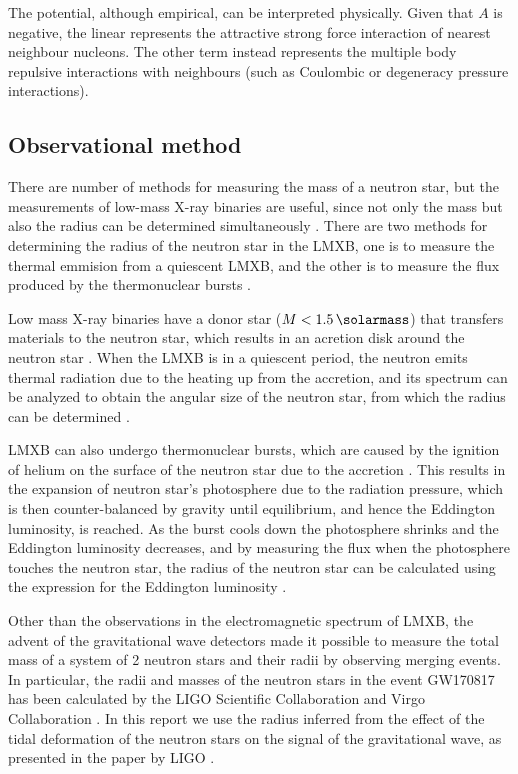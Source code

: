 \documentclass[draft,11pt]{article}
\theoremstyle{definition}
\theoremstyle{remark}
\begin{document}
                The potential, although empirical, can be interpreted physically. Given that $A$ is negative, the linear represents the attractive strong force interaction of nearest neighbour nucleons. The other term instead represents the multiple body repulsive interactions with neighbours \parencite{bludman.dover.1980/extrapolation.skyrme.eos} (such as Coulombic or degeneracy pressure interactions).
            
        \subsection{Observational method}
            There are number of methods for measuring the mass of a neutron star, but the measurements of low-mass X-ray binaries are useful, since not only the mass but also the radius can be determined simultaneously \parencite{ozel.paulo.2016/masses.radii.eos}. There are two methods for determining the radius of the neutron star in the LMXB, one is to measure the thermal emmision from a quiescent LMXB, and the other is to measure the flux produced by the thermonuclear bursts \parencite{ozel.paulo.2016/masses.radii.eos}.
            
            Low mass X-ray binaries have a donor star ($M<\SI{1.5}{\solarmass}$) that transfers materials to the neutron star, which results in an acretion disk around the neutron star \parencite{tauris.2003/xray.binary}. When the LMXB is in a quiescent period, the neutron emits thermal radiation due to the heating up from the accretion, and its spectrum can be analyzed to obtain the angular size of the neutron star, from which the radius can be determined \parencite{ozel.psaltis.2016/radius.oberve}.
            
            LMXB can also undergo thermonuclear bursts, which are caused by the ignition of helium on the surface of the neutron star due to the accretion \parencite{ozel.paulo.2016/masses.radii.eos}. This results in the expansion of neutron star's photosphere due to the radiation pressure, which is then counter-balanced by gravity until equilibrium, and hence the Eddington luminosity, is reached. As the burst cools down the photosphere shrinks and the Eddington luminosity decreases, and by measuring the flux when the photosphere touches the neutron star, the radius of the neutron star can be calculated using the expression for the Eddington luminosity \parencite{ozel.psaltis.2016/radius.oberve}.
            
           Other than the observations in the electromagnetic spectrum of LMXB, the advent of the gravitational wave detectors made it possible to measure the total mass of a system of 2 neutron stars and their radii by observing merging events. In particular, the  radii and masses of the neutron stars in the event GW170817 has been calculated by the LIGO Scientific Collaboration and Virgo Collaboration \cite{ligo.virgo.2019/prop.of.ns.merger.GW170817,ligo.virgo.2018/GW170817.ns.radii}. In this report we use the radius inferred from the effect of the tidal deformation of the neutron stars on the signal of the gravitational wave, as presented in the paper by LIGO \cite{ligo.virgo.2018/GW170817.ns.radii}.
    
\end{document}
